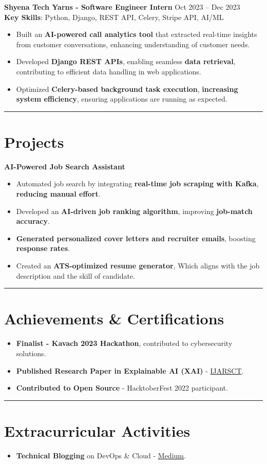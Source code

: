 \documentclass[a4paper,10pt]{article}
\begin{document}
\vspace{3 pt}
\textbf{Shyena Tech Yarns - Software Engineer Intern} \hfill Oct 2023 -- Dec 2023\\
\textbf{Key Skills}: Python, Django, REST API, Celery, Stripe API, AI/ML  
\begin{itemize}
    \item Built an \textbf{AI-powered call analytics tool} that extracted real-time insights from customer conversations, enhancing understanding of customer needs.  
    \item Developed \textbf{Django REST APIs}, enabling seamless \textbf{data retrieval}, contributing to efficient data handling in web applications.  
    \item Optimized \textbf{Celery-based background task execution}, \textbf{increasing system efficiency}, ensuring applications are running as expected.  
\end{itemize}
\vspace{3 pt}


\hrule
\section*{Projects}
\textbf{AI-Powered Job Search Assistant}  
\begin{itemize}
    \item Automated job search by integrating \textbf{real-time job scraping with Kafka}, \textbf{reducing manual effort}.  
    \item Developed an \textbf{AI-driven job ranking algorithm}, improving \textbf{job-match accuracy}.  
    \item \textbf{Generated personalized cover letters and recruiter emails}, boosting \textbf{response rates}.  
    \item Created an \textbf{ATS-optimized resume generator}, Which aligns with the job description and the skill of candidate.  
\end{itemize}

\vspace{3 pt}

\hrule
\vspace{3pt}

\section*{Achievements \& Certifications}
\begin{itemize}
    \item \textbf{Finalist - Kavach 2023 Hackathon}, contributed to cybersecurity solutions.
    \item \textbf{Published Research Paper in Explainable AI (XAI)} - \href{https://ijarsct.co.in/Paper18344.pdf}{IJARSCT}.
    \item \textbf{Contributed to Open Source} - HacktoberFest 2022 participant.
\end{itemize}

\hrule
\vspace{3pt}

\section*{Extracurricular Activities}
\begin{itemize}
    \item \textbf{Technical Blogging} on DevOps \& Cloud - \href{https://medium.com/@yash.7232.rajput}{Medium}.
\end{itemize}
\end{document}
